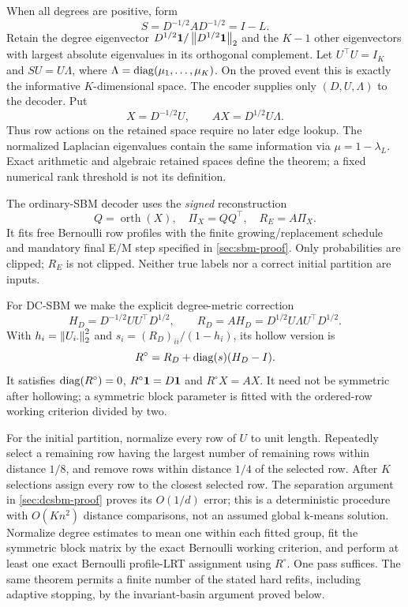 When all degrees are positive, form
\[
 S=D^{-1/2}AD^{-1/2}=I-L.
\]
Retain the degree eigenvector $D^{1/2}\mathbf 1/\left\lVert D^{1/2}\mathbf 1\right\rVert_2$ and the
$K-1$ other eigenvectors with largest absolute eigenvalues in its orthogonal
complement. Let $U^\top U=I_K$ and $SU=U\Lambda$, where
$\Lambda=\operatorname{diag}(\mu_1,\ldots,\mu_K)$. On the proved event this is exactly
the informative $K$-dimensional space. The encoder supplies only
$(D,U,\Lambda)$ to the decoder. Put
\begin{equation}\label{eq:encoder-action}
 X=D^{-1/2}U,\qquad AX=D^{1/2}U\Lambda.
\end{equation}
Thus row actions on the retained space require no later edge lookup.
The normalized Laplacian eigenvalues contain the same information via
$\mu=1-\lambda_L$. Exact arithmetic and algebraic retained spaces define
the theorem; a fixed numerical rank threshold is not its definition.

The ordinary-SBM decoder uses the \emph{signed} reconstruction
\begin{equation}\label{eq:euclidean-decoder}
 Q=\operatorname{orth}(X),\quad \Pi_X=QQ^\top,\quad R_E=A\Pi_X.
\end{equation}
It fits free Bernoulli row profiles with the finite growing/replacement
schedule and mandatory final E/M step specified in
\cref{sec:sbm-proof}. Only probabilities are clipped; $R_E$ is not clipped.
Neither true labels nor a correct initial partition are inputs.

For DC-SBM we make the explicit degree-metric correction
\begin{equation}\label{eq:metric-decoder}
 H_D=D^{-1/2}UU^\top D^{1/2},\qquad
 R_D=AH_D=D^{1/2}U\Lambda U^\top D^{1/2}.
\end{equation}
With $h_i=\left\lVert U_{i\cdot}\right\rVert_2^2$ and
$s_i=(R_D)_{ii}/(1-h_i)$, its hollow version is
\begin{equation}\label{eq:hollow-decoder}
 R^\circ=R_D+\operatorname{diag}(s)(H_D-I).
\end{equation}
It satisfies
$\operatorname{diag}(R^\circ)=0$, $R^\circ\mathbf 1=D\mathbf 1$ and $R^\circ X=AX$.
It need not be symmetric after hollowing; a symmetric block parameter is
fitted with the ordered-row working criterion divided by two.

For the initial partition, normalize every row of $U$ to unit length.
Repeatedly select a remaining row having the largest number of remaining
rows within distance $1/8$, and remove rows within distance $1/4$ of the
selected row. After $K$ selections assign every row to the closest selected
row. The separation argument in \cref{sec:dcsbm-proof} proves its
$O(1/d)$ error; this is a deterministic procedure with $O(Kn^2)$ distance
comparisons, not an assumed global k-means solution.
Normalize degree estimates to mean one within each fitted group, fit
the symmetric block matrix by the exact Bernoulli working criterion, and
perform at least one exact Bernoulli profile-LRT assignment using
$R^\circ$. One pass suffices. The same theorem permits a finite number of
the stated hard refits, including adaptive stopping, by the invariant-basin
argument proved below.

